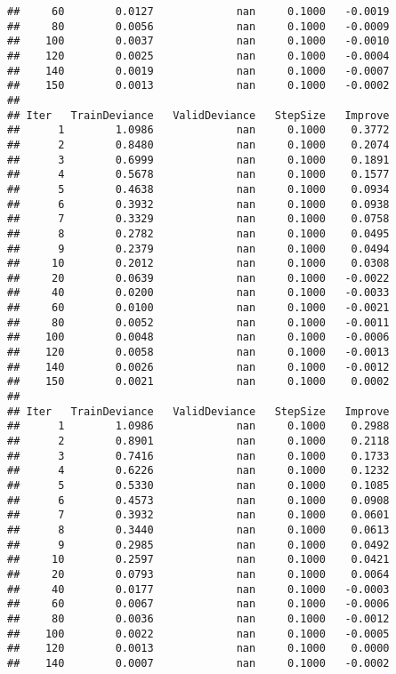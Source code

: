 \documentclass[
]{article}
\begin{document}
\begin{verbatim}
##     60        0.0127             nan     0.1000   -0.0019
##     80        0.0056             nan     0.1000   -0.0009
##    100        0.0037             nan     0.1000   -0.0010
##    120        0.0025             nan     0.1000   -0.0004
##    140        0.0019             nan     0.1000   -0.0007
##    150        0.0013             nan     0.1000   -0.0002
## 
## Iter   TrainDeviance   ValidDeviance   StepSize   Improve
##      1        1.0986             nan     0.1000    0.3772
##      2        0.8480             nan     0.1000    0.2074
##      3        0.6999             nan     0.1000    0.1891
##      4        0.5678             nan     0.1000    0.1577
##      5        0.4638             nan     0.1000    0.0934
##      6        0.3932             nan     0.1000    0.0938
##      7        0.3329             nan     0.1000    0.0758
##      8        0.2782             nan     0.1000    0.0495
##      9        0.2379             nan     0.1000    0.0494
##     10        0.2012             nan     0.1000    0.0308
##     20        0.0639             nan     0.1000   -0.0022
##     40        0.0200             nan     0.1000   -0.0033
##     60        0.0100             nan     0.1000   -0.0021
##     80        0.0052             nan     0.1000   -0.0011
##    100        0.0048             nan     0.1000   -0.0006
##    120        0.0058             nan     0.1000   -0.0013
##    140        0.0026             nan     0.1000   -0.0012
##    150        0.0021             nan     0.1000    0.0002
## 
## Iter   TrainDeviance   ValidDeviance   StepSize   Improve
##      1        1.0986             nan     0.1000    0.2988
##      2        0.8901             nan     0.1000    0.2118
##      3        0.7416             nan     0.1000    0.1733
##      4        0.6226             nan     0.1000    0.1232
##      5        0.5330             nan     0.1000    0.1085
##      6        0.4573             nan     0.1000    0.0908
##      7        0.3932             nan     0.1000    0.0601
##      8        0.3440             nan     0.1000    0.0613
##      9        0.2985             nan     0.1000    0.0492
##     10        0.2597             nan     0.1000    0.0421
##     20        0.0793             nan     0.1000    0.0064
##     40        0.0177             nan     0.1000   -0.0003
##     60        0.0067             nan     0.1000   -0.0006
##     80        0.0036             nan     0.1000   -0.0012
##    100        0.0022             nan     0.1000   -0.0005
##    120        0.0013             nan     0.1000    0.0000
##    140        0.0007             nan     0.1000   -0.0002

\end{verbatim}
\end{document}
